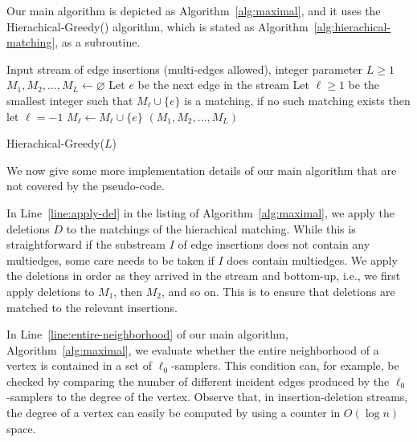 \documentclass[11pt,a4paper]{article}
\begin{document}
Our main algorithm is depicted as Algorithm~\ref{alg:maximal}, and it uses the \textsf{Hierachical-Greedy}() algorithm, which is stated as Algorithm~\ref{alg:hierachical-matching}, as a subroutine.


\begin{algorithm}
    \begin{algorithmic}[1]
        \REQUIRE Input stream of edge insertions (multi-edges allowed), integer parameter $L \ge 1$
        \STATE $M_1, M_2, \dots, M_{L} \gets \varnothing$
            \STATE Let $e$ be the next edge in the stream
            \STATE Let $\ell \ge 1$ be the smallest integer such that $M_{\ell} \cup \{e\}$ is a matching, if no such matching exists then let $\ell = -1$
                \STATE $M_{\ell} \gets M_{\ell} \cup \{e\}$
            \ENDIF
        \ENDWHILE
        \RETURN $(M_1, M_2, \dots, M_{L})$
    \end{algorithmic}
    \caption{\textsf{Hierachical-Greedy($L$)}  \label{alg:hierachical-matching}}
\end{algorithm}

We now give some more implementation details of our main algorithm that are not covered by the pseudo-code.

In Line~\ref{line:apply-del} in the listing of Algorithm~\ref{alg:maximal}, we apply the deletions $D$ to the matchings of the hierachical matching. While this is straightforward if the substream $I$ of edge insertions does not contain any multiedges, some care needs to be taken if $I$ does contain multiedges. We apply the deletions in order as they arrived in the stream and bottom-up, i.e., we first apply deletions to $M_1$, then $M_2$, and so on. This is to ensure that deletions are matched to the relevant insertions.

In Line~\ref{line:entire-neighborhood} of our main algorithm, Algorithm~\ref{alg:maximal}, we evaluate whether the entire neighborhood of a vertex is contained in a set of $\ell_0$-samplers. This condition can, for example, be checked by comparing the number of different incident edges produced by the $\ell_0$-samplers to the degree of the vertex. Observe that, in insertion-deletion streams, the degree of a vertex can easily be computed by using a counter in $O(\log n)$ space. 
\end{document}
